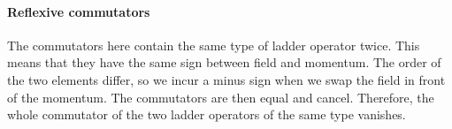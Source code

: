 \documentclass[11pt, english, fleqn, DIV=15, headinclude, BCOR=1cm]{scrartcl}
\begin{document}
\paragraph{Reflexive commutators}

The commutators here contain the same type of ladder operator twice. This means
that they have the same sign between field and momentum. The order of the two
elements differ, so we incur a minus sign when we swap the field in front of
the momentum. The commutators are then equal and cancel. Therefore, the whole
commutator of the two ladder operators of the same type vanishes.
\end{document}

